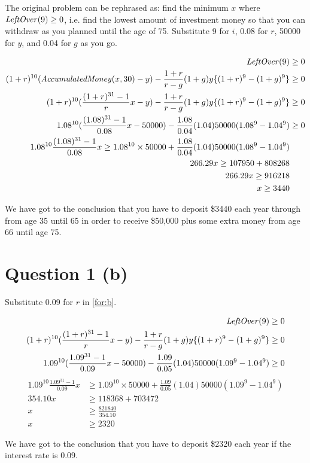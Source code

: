 \documentclass[11pt]{report}
\begin{document}
The original problem can be rephrased as: find the minimum $x$ where $\mathit{LeftOver}(9) \ge 0$, i.e. find the lowest amount of investment money so that you can withdraw as you planned until the age of 75.
Substitute 9 for $i$, 0.08 for $r$, 50000 for $y$, and 0.04 for $g$ as you go.

\begin{align}
  \mathit{LeftOver}(9) &\ge 0 \nonumber \\ 
  (1+r)^{10}(\mathit{AccumulatedMoney}(x, 30) - y) - \frac{1+r}{r-g}(1+g)y\{(1+r)^9 - (1+g)^9\} &\ge 0 \nonumber \\
  (1+r)^{10}(\frac{(1 + r)^{31}-1}{r}x - y) - \frac{1+r}{r-g}(1+g)y\{(1+r)^9 - (1+g)^9\} &\ge 0 \label{for:b}\\
  1.08^{10}(\frac{(1.08)^{31}-1}{0.08}x - 50000) - \frac{1.08}{0.04}(1.04)50000(1.08^9 - 1.04^9) &\ge 0 \nonumber\\
  1.08^{10}\frac{(1.08)^{31}-1}{0.08}x \ge 1.08^{10}\times50000 + \frac{1.08}{0.04}(1.04)50000(1.08^9 - 1.04^9) \nonumber\\
  266.29x \ge 107950 +808268 \nonumber\\
  266.29x \ge 916218 \nonumber\\
  x \ge 3440
\end{align}

We have got to the conclusion that you have to deposit \$3440 each year through from age 35 until 65 in order to receive \$50,000 plus some extra money from age 66 until age 75.

\section*{Question 1 (b)}
Substitute 0.09 for $r$ in \eqref{for:b}.

\begin{align}
  \mathit{LeftOver}(9) &\ge 0 \nonumber \\ 
  (1+r)^{10}(\frac{(1 + r)^{31}-1}{r}x - y) - \frac{1+r}{r-g}(1+g)y\{(1+r)^9 - (1+g)^9\} &\ge 0 \nonumber\\
  1.09^{10}(\frac{1.09^{31}-1}{0.09}x - 50000) - \frac{1.09}{0.05}(1.04)50000(1.09^9 - 1.04^9) &\ge 0 \nonumber
\end{align}
\begin{align}
  1.09^{10}\frac{1.09^{31}-1}{0.09}x &\ge 1.09^{10}\times50000 + \frac{1.09}{0.05}(1.04)50000(1.09^9 - 1.04^9) \nonumber\\
  354.10x &\ge 118368 + 703472 \nonumber \\
  x &\ge \frac{821840}{354.10} \nonumber \\
  x &\ge 2320
\end{align}
  
We have got to the conclusion that you have to deposit \$2320 each year if the interest rate is 0.09.
\end{document}
